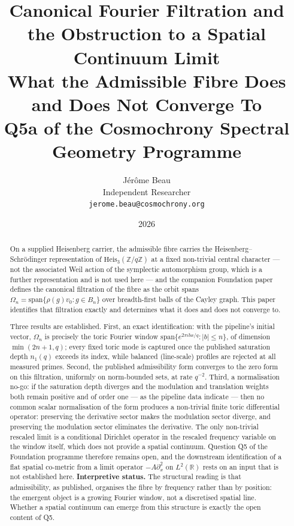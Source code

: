 \documentclass[11pt,a4paper]{article}
\title{Canonical Fourier Filtration and the Obstruction to a Spatial Continuum Limit\\[0.5ex]
{\large What the Admissible Fibre Does and Does Not Converge To\\[0.3ex]
Q5a of the Cosmochrony Spectral Geometry Programme}}
\author{J\'er\^ome Beau\\[0.5ex]
\small Independent Researcher\\
\small \texttt{jerome.beau@cosmochrony.org}}
\date{2026}
\theoremstyle{plain}
\theoremstyle{definition}
\theoremstyle{remark}
\newcommand{\Heis}{\mathrm{Heis}_3}
\newcommand{\Z}{\mathbb{Z}}
\newcommand{\R}{\mathbb{R}}
\begin{document}
  \maketitle

  \begin{abstract}
    On a supplied Heisenberg carrier, the admissible fibre carries the
    Heisenberg--Schrödinger representation of $\Heis(\Z/q\Z)$ at a fixed non-trivial central
    character --- not the associated Weil action of the symplectic automorphism group, which is a
    further representation and is not used here --- and the companion
    Foundation paper defines the
    canonical filtration of the fibre as the orbit spans
    $\Omega_n = \mathrm{span}\{\rho(g)v_0 : g \in B_n\}$ over breadth-first balls of the Cayley graph.
    This paper identifies that filtration exactly and determines what it does and does not converge to.

    Three results are established.
    First, an exact identification: with the pipeline's initial vector, $\Omega_n$ is precisely the
    toric Fourier window $\mathrm{span}\{e^{2\pi i b x/q} : |b| \le n\}$, of dimension $\min(2n+1, q)$;
    every fixed toric mode is captured once the published saturation depth $n_1(q)$ exceeds its index,
    while balanced (line-scale) profiles are rejected at all measured primes.
    Second, the published admissibility form converges to the zero form on this filtration, uniformly on
    norm-bounded sets, at rate $q^{-2}$.
    Third, a normalisation no-go: if the saturation depth diverges and the modulation and translation
    weights both remain positive and of order one --- as the pipeline data indicate --- then no common
    scalar normalisation of the form
    produces a non-trivial finite toric differential operator: preserving the derivative sector makes
    the modulation sector diverge, and preserving the modulation sector eliminates the derivative.
    The only non-trivial rescaled limit is a conditional Dirichlet operator in the rescaled frequency
    variable on the window itself, which does not provide a spatial continuum.
    Question Q5 of the Foundation programme therefore remains open, and the downstream identification of
    a flat spatial co-metric from a limit operator $-A\partial_x^2$ on $L^2(\R)$ rests on an input that
    is not established here.
    \textbf{Interpretive status.}
    The structural reading is that admissibility, as published, organises the fibre by frequency rather
    than by position: the emergent object is a growing Fourier window, not a discretised spatial line.
    Whether a spatial continuum can emerge from this structure is exactly the open content of Q5.
  \end{abstract}
\end{document}
